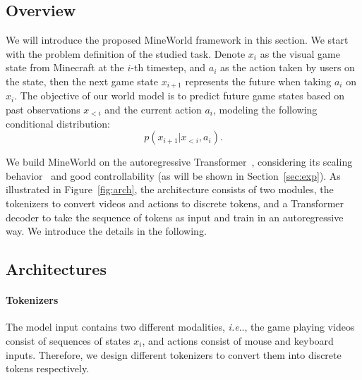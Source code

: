 \documentclass{article} %
\makeatletter
\DeclareRobustCommand\onedot{\futurelet\@let@token\@onedot}
\def\@onedot{\ifx\@let@token.\else.\null\fi\xspace}
\def\ie{\emph{i.e}\onedot} \def\Ie{\emph{I.e}\onedot}
\makeatother
\begin{document}
\subsection{Overview}
We will introduce the proposed MineWorld framework in this section. We start with the problem definition of the studied task. Denote $x_{i}$ as the visual game state from Minecraft at the $i$-th timestep, and $a_{i}$ as the action taken by users on the state, then the next game state $x_{i+1}$ represents the future when taking $a_i$ on $x_i$. The objective of our world model is to predict future game states based on past observations $x_{<i}$ and the current action $a_i$, modeling the following conditional distribution:
\begin{equation}
    \label{equ:world_model}
    p(x_{i+1} | x_{<i}, a_i).
\end{equation}

We build MineWorld on the autoregressive Transformer~\citep{vaswani2017attention}, considering its scaling behavior~\citep{kaplan2020scaling,brown2020language-gpt3} and good controllability (as will be shown in Section~\ref{sec:exp}). As illustrated in Figure~\ref{fig:arch}, the architecture consists of two modules, the tokenizers to convert videos and actions to discrete tokens, and a Transformer decoder to take the sequence of tokens as input and train in an autoregressive way. We introduce the details in the following.

\subsection{Architectures}
\label{sec:framework-arch}

\paragraph{Tokenizers}
The model input contains two different modalities, \ie, the game playing videos consist of sequences of states $x_i$, and actions consist of mouse and keyboard inputs. Therefore, we design different tokenizers to convert them into discrete tokens respectively. 
\end{document}

